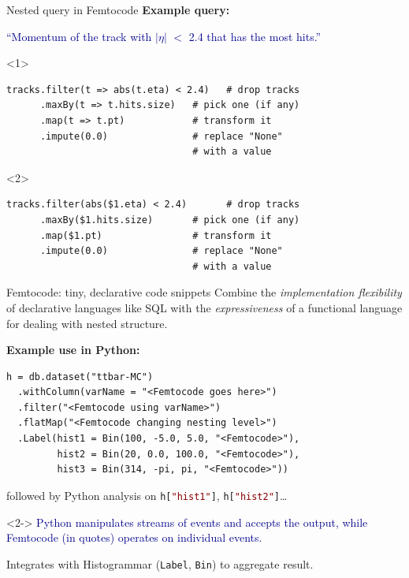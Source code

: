 \documentclass{beamer}
\begin{document}
\begin{frame}[fragile]{Nested query in Femtocode}
\vspace{0.5 cm}
{\bf Example query:}
\begin{center}
\begin{minipage}{0.95\linewidth}
\textcolor{darkblue}{``Momentum of the track with $|\eta|$ $<$ 2.4 that has the most hits.''}
\end{minipage}
\end{center}
\small
\begin{onlyenv}<1>
\begin{verbatim}
tracks.filter(t => abs(t.eta) < 2.4)   # drop tracks
      .maxBy(t => t.hits.size)   # pick one (if any)
      .map(t => t.pt)            # transform it
      .impute(0.0)               # replace "None"
                                 # with a value
\end{verbatim}
\end{onlyenv}
\begin{onlyenv}<2>
\begin{verbatim}
tracks.filter(abs($1.eta) < 2.4)       # drop tracks
      .maxBy($1.hits.size)       # pick one (if any)
      .map($1.pt)                # transform it
      .impute(0.0)               # replace "None"
                                 # with a value
\end{verbatim}
\end{onlyenv}
\end{frame}

\begin{frame}[fragile]{Femtocode: tiny, declarative code snippets}
\vspace{0.4 cm}
Combine the {\it implementation flexibility} of declarative languages like SQL with the {\it expressiveness} of a functional language for dealing with nested structure.

\vspace{0.5 cm}
{\bf Example use in Python:}

\small
\begin{verbatim}
h = db.dataset("ttbar-MC")
  .withColumn(varName = "<Femtocode goes here>")
  .filter("<Femtocode using varName>")
  .flatMap("<Femtocode changing nesting level>")
  .Label(hist1 = Bin(100, -5.0, 5.0, "<Femtocode>"),
         hist2 = Bin(20, 0.0, 100.0, "<Femtocode>"),
         hist3 = Bin(314, -pi, pi, "<Femtocode>"))
\end{verbatim}

\normalsize
followed by Python analysis on {\small\tt h[\textcolor{darkred}{"hist1"}]}, {\small\tt h[\textcolor{darkred}{"hist2"}]}\ldots

\vspace{0.1 cm}
\begin{uncoverenv}<2->
\textcolor{darkblue}{Python manipulates streams of events and accepts the output, while Femtocode (in quotes) operates on individual events.}

\vspace{0.1 cm}
Integrates with Histogrammar ({\tt\small Label}, {\tt\small Bin}) to aggregate result.
\end{uncoverenv}
\end{frame}
\end{document}
